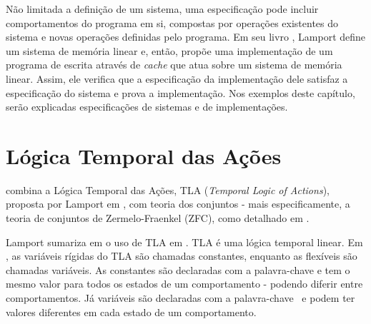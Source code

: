 Não limitada a definição de um sistema, uma especificação pode incluir comportamentos do programa em si, compostas por operações existentes do sistema e novas operações definidas pelo programa. Em seu livro \cite{specifying-systems}, Lamport define um sistema de memória linear e, então, propõe uma implementação de um programa de escrita através de \textit{cache} que atua sobre um sistema de memória linear. Assim, ele verifica que a especificação da implementação dele satisfaz a especificação do sistema e prova a implementação. Nos exemplos deste capítulo, serão explicadas especificações de sistemas e de implementações.

\section{Lógica Temporal das Ações}

\TLA combina a Lógica Temporal das Ações, TLA (\textit{Temporal Logic of Actions}), proposta por Lamport em \cite{tlaformalization}, com teoria dos conjuntos - mais especificamente, a teoria de conjuntos de Zermelo-Fraenkel (ZFC), como detalhado em \cite{merzlogic}.

Lamport sumariza em \cite{proofsystem} o uso de TLA em \TLA. TLA é uma lógica temporal linear. Em \TLA, as variáveis rígidas do TLA são chamadas constantes, enquanto as flexíveis são chamadas variáveis. As constantes são declaradas com a palavra-chave \CONSTANTS e tem o mesmo valor para todos os estados de um comportamento - podendo diferir entre comportamentos. Já variáveis são declaradas com a palavra-chave \VARIABLES\ e podem ter valores diferentes em cada estado de um comportamento.

